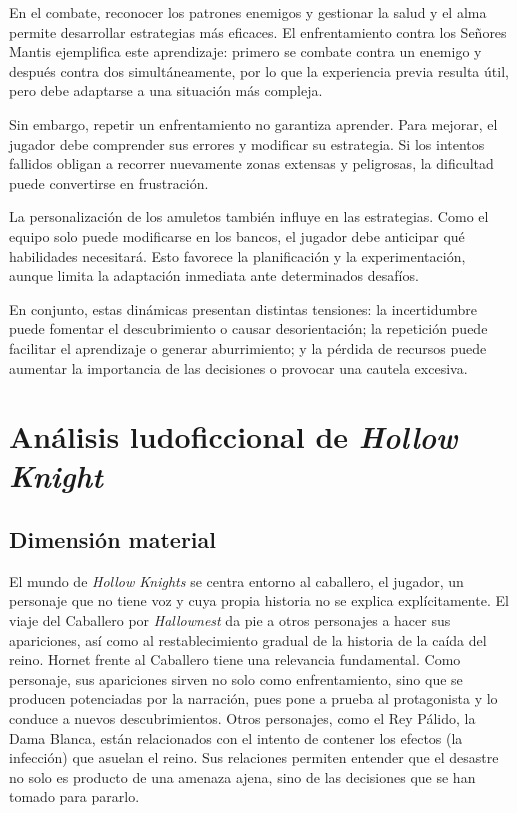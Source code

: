 \documentclass[12pt,a4paper]{article}
\begin{document}
En el combate, reconocer los patrones enemigos y gestionar la salud y el alma permite desarrollar estrategias más eficaces. El enfrentamiento contra los Señores Mantis ejemplifica este aprendizaje: primero se combate contra un enemigo y después contra dos simultáneamente, por lo que la experiencia previa resulta útil, pero debe adaptarse a una situación más compleja.

Sin embargo, repetir un enfrentamiento no garantiza aprender. Para mejorar, el jugador debe comprender sus errores y modificar su estrategia. Si los intentos fallidos obligan a recorrer nuevamente zonas extensas y peligrosas, la dificultad puede convertirse en frustración.

La personalización de los amuletos también influye en las estrategias. Como el equipo solo puede modificarse en los bancos, el jugador debe anticipar qué habilidades necesitará. Esto favorece la planificación y la experimentación, aunque limita la adaptación inmediata ante determinados desafíos.

En conjunto, estas dinámicas presentan distintas tensiones: la incertidumbre puede fomentar el descubrimiento o causar desorientación; la repetición puede facilitar el aprendizaje o generar aburrimiento; y la pérdida de recursos puede aumentar la importancia de las decisiones o provocar una cautela excesiva.

\section{Análisis ludoficcional de \textit{Hollow Knight}}
\subsection{Dimensión material}
El mundo de \textit{Hollow Knights} se centra entorno al caballero, el jugador, un personaje que no tiene voz y cuya propia historia no se explica explícitamente. El viaje del Caballero por \textit{Hallownest} da pie a otros personajes a hacer sus apariciones, así como al restablecimiento gradual de la historia de la caída del reino. Hornet frente al Caballero tiene una relevancia fundamental. Como personaje, sus apariciones sirven no solo como enfrentamiento, sino que se producen potenciadas por la narración, pues pone a prueba al protagonista y lo conduce a nuevos descubrimientos. Otros personajes, como el Rey Pálido, la Dama Blanca, están relacionados con el intento de contener los efectos (la infección) que asuelan el reino. Sus relaciones permiten entender que el desastre no solo es producto de una amenaza ajena, sino de las decisiones que se han tomado para pararlo.
\end{document}
